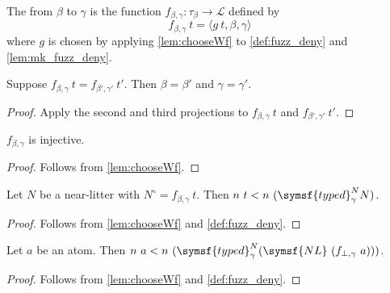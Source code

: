 \begin{definition}
    The  from \( \beta \) to \( \gamma \) is the function \( f_{\beta,\gamma} : \tau_\beta \to \mathcal L \) defined by
    \[ f_{\beta,\gamma}\ t = \langle g\ t, \beta, \gamma \rangle \]
    where \( g \) is chosen by applying \cref{lem:chooseWf} to \cref{def:fuzz_deny} and \cref{lem:mk_fuzz_deny}.
\end{definition}
\begin{lemma}
    \label{lem:fuzz_congr}
    Suppose \( f_{\beta,\gamma}\ t = f_{\beta',\gamma'}\ t' \).
    Then \( \beta = \beta' \) and \( \gamma = \gamma' \).
\end{lemma}
\begin{proof}
    Apply the second and third projections to \( f_{\beta,\gamma}\ t \) and \( f_{\beta',\gamma'}\ t' \).
\end{proof}
\begin{lemma}
    \( f_{\beta,\gamma} \) is injective.
\end{lemma}
\begin{proof}
    Follows from \cref{lem:chooseWf}.
\end{proof}
\begin{lemma}
    \label{lem:fuzz_pos}
    Let \( N \) be a near-litter with \( N^\circ = f_{\beta,\gamma}\ t \).
    Then \( n\ t < n\ (\symsf{typed}^N_\gamma N) \).
\end{lemma}
\begin{proof}
    Follows from \cref{lem:chooseWf} and \cref{def:fuzz_deny}.
\end{proof}
\begin{lemma}
    \label{lem:pos_atom_lt_fuzz}
    Let \( a \) be an atom.
    Then \( n\ a < n\ (\symsf{typed}^N_\gamma (\symsf{NL}\ (f_{\bot,\gamma}\ a))) \).
\end{lemma}
\begin{proof}
    Follows from \cref{lem:chooseWf} and \cref{def:fuzz_deny}.
\end{proof}
